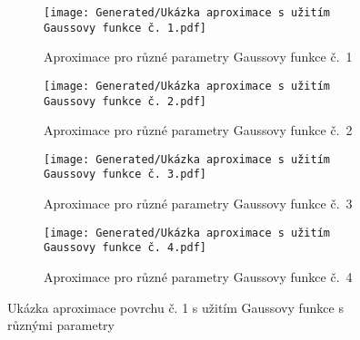 \begin{landscapeimagepage}
    \begin{figure}[H]
        \centering
        \begin{subfigure}{.5\textheight}
            \centering
            \texttt{[image: Generated/Ukázka aproximace s užitím Gaussovy funkce č. 1.pdf]}
            \caption{Aproximace pro různé parametry Gaussovy funkce č.~1}
            \label{fig:Ukázka aproximace povrchu s užitím Gaussovy funkce č. 1}
        \end{subfigure}
        \vspace{0.5cm}
        \hspace{2.5cm}
        \begin{subfigure}{.5\textheight}
            \centering
            \texttt{[image: Generated/Ukázka aproximace s užitím Gaussovy funkce č. 2.pdf]}
            \caption{Aproximace pro různé parametry Gaussovy funkce č.~2}
            \label{fig:Ukázka aproximace povrchu s užitím Gaussovy funkce č. 2}
        \end{subfigure}
        \vspace{0.5cm}
        \begin{subfigure}{.5\textheight}
            \centering
            \texttt{[image: Generated/Ukázka aproximace s užitím Gaussovy funkce č. 3.pdf]}
            \caption{Aproximace pro různé parametry Gaussovy funkce č.~3}
            \label{fig:Ukázka aproximace povrchu s užitím Gaussovy funkce č. 3}
        \end{subfigure}
        \hspace{2.5cm}
        \begin{subfigure}{.5\textheight}
            \centering
            \texttt{[image: Generated/Ukázka aproximace s užitím Gaussovy funkce č. 4.pdf]}
            \caption{Aproximace pro různé parametry Gaussovy funkce č.~4}
            \label{fig:Ukázka aproximace povrchu s užitím Gaussovy funkce č. 4}
        \end{subfigure}
        \caption{Ukázka aproximace povrchu č. 1 s užitím Gaussovy funkce s různými parametry}
        \label{fig:Ukázka aproximace povrchu č. 1 s užitím Gaussovy funkce s různými parametry}
    \end{figure}
\end{landscapeimagepage}

